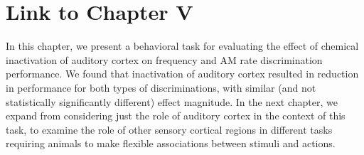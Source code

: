 \section{Link to Chapter V}
In this chapter, we present a behavioral task for evaluating the effect of chemical inactivation of auditory cortex on frequency and AM rate discrimination performance. 
%
We found that inactivation of auditory cortex resulted in reduction in performance for both types of discriminations, with similar (and not statistically significantly different) effect magnitude. 
%
In the next chapter, we expand from considering just the role of auditory cortex in the context of this task, to examine the role of other sensory cortical regions in different tasks requiring animals to make flexible associations between stimuli and actions. 














